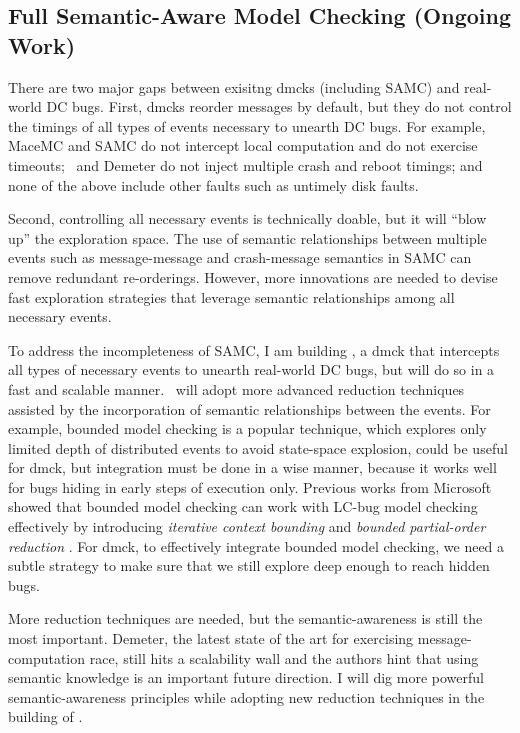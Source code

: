 \documentclass[11pt]{article}
\begin{document}
\subsection{Full Semantic-Aware Model Checking (Ongoing Work)} 

There are two major gaps between exisitng dmcks (including SAMC) and real-world
DC bugs. First, dmcks reorder messages by default, but they do not control the
timings of all types of events necessary to unearth DC bugs. For example, MaceMC
and SAMC do not intercept local computation and do not exercise timeouts;
\modist\ and Demeter do not inject multiple crash and reboot timings; and none
of the above include other faults such as untimely disk faults.

Second, controlling all necessary events is technically doable, but it will
``blow up'' the exploration space. The use of semantic relationships between
multiple events such as message-message and crash-message semantics in SAMC can
remove redundant re-orderings. However, more innovations are needed to devise
fast exploration strategies that leverage semantic relationships among all
necessary events.

To address the incompleteness of SAMC, I am building \fullcheck, a dmck that
intercepts all types of necessary events to unearth real-world DC bugs, but will
do so in a fast and scalable manner. \fullcheck\ will adopt more advanced
reduction techniques assisted by the incorporation of semantic relationships
between the events. For example, bounded model checking is a popular technique,
which explores only limited depth of distributed events to avoid state-space
explosion, could be useful for dmck, but integration must be done in a wise
manner, because it works well for bugs hiding in early steps of execution only.
Previous works from Microsoft showed that bounded model checking can work with
LC-bug model checking effectively by introducing \textit{iterative context
bounding} \cite{Musuvathi+07-BoundedMc} and \textit{bounded partial-order
reduction} \cite{Coons+13-Bpor}. For dmck, to effectively integrate bounded
model checking, we need a subtle strategy to make sure that we still explore
deep enough to reach hidden bugs.

More reduction techniques are needed, but the semantic-awareness is still the
most important. Demeter, the latest state of the art for exercising
message-computation race, still hits a scalability wall and the authors hint
that using semantic knowledge is an important future direction. I will dig more
powerful semantic-awareness principles while adopting new reduction techniques
in the building of \fullcheck.
\end{document}

